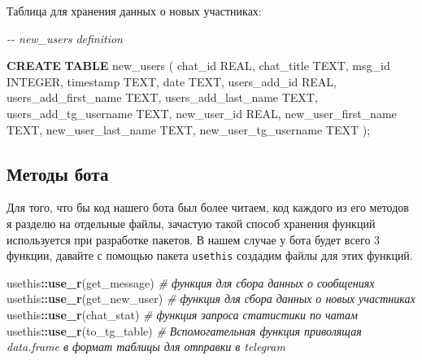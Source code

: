 \documentclass[
]{book}
\newenvironment{Shaded}{\begin{snugshade}}{\end{snugshade}}
\newcommand{\CommentTok}[1]{\textcolor[rgb]{0.56,0.35,0.01}{\textit{#1}}}
\newcommand{\DataTypeTok}[1]{\textcolor[rgb]{0.13,0.29,0.53}{#1}}
\newcommand{\FunctionTok}[1]{\textcolor[rgb]{0.13,0.29,0.53}{\textbf{#1}}}
\newcommand{\KeywordTok}[1]{\textcolor[rgb]{0.13,0.29,0.53}{\textbf{#1}}}
\newcommand{\NormalTok}[1]{#1}
\newcommand{\SpecialCharTok}[1]{\textcolor[rgb]{0.81,0.36,0.00}{\textbf{#1}}}
\newcommand{\StringTok}[1]{\textcolor[rgb]{0.31,0.60,0.02}{#1}}
\begin{document}
Таблица для хранения данных о новых участниках:

\begin{Shaded}
\begin{Highlighting}[]
\CommentTok{{-}{-} new\_users definition}

\KeywordTok{CREATE} \KeywordTok{TABLE}\NormalTok{ \textasciigrave{}new\_users\textasciigrave{} (}
\NormalTok{  \textasciigrave{}chat\_id\textasciigrave{} }\DataTypeTok{REAL}\NormalTok{,}
\NormalTok{  \textasciigrave{}chat\_title\textasciigrave{} TEXT,}
\NormalTok{  \textasciigrave{}msg\_id\textasciigrave{} }\DataTypeTok{INTEGER}\NormalTok{,}
\NormalTok{  \textasciigrave{}timestamp\textasciigrave{} TEXT,}
\NormalTok{  \textasciigrave{}date\textasciigrave{} TEXT,}
\NormalTok{  \textasciigrave{}users\_add\_id\textasciigrave{} }\DataTypeTok{REAL}\NormalTok{,}
\NormalTok{  \textasciigrave{}users\_add\_first\_name\textasciigrave{} TEXT,}
\NormalTok{  \textasciigrave{}users\_add\_last\_name\textasciigrave{} TEXT,}
\NormalTok{  \textasciigrave{}users\_add\_tg\_username\textasciigrave{} TEXT,}
\NormalTok{  \textasciigrave{}new\_user\_id\textasciigrave{} }\DataTypeTok{REAL}\NormalTok{,}
\NormalTok{  \textasciigrave{}new\_user\_first\_name\textasciigrave{} TEXT,}
\NormalTok{  \textasciigrave{}new\_user\_last\_name\textasciigrave{} TEXT,}
\NormalTok{  \textasciigrave{}new\_user\_tg\_username\textasciigrave{} TEXT}
\NormalTok{);}
\end{Highlighting}
\end{Shaded}

\subsection{Методы бота}\label{ux43cux435ux442ux43eux434ux44b-ux431ux43eux442ux430}

Для того, что бы код нашего бота был более читаем, код каждого из его методов я разделю на отдельные файлы, зачастую такой способ хранения функций используется при разработке пакетов. В нашем случае у бота будет всего 3 функции, давайте с помощью пакета \texttt{usethis} создадим файлы для этих функций.

\begin{Shaded}
\begin{Highlighting}[]
\NormalTok{usethis}\SpecialCharTok{::}\FunctionTok{use\_r}\NormalTok{(}\StringTok{\textquotesingle{}get\_message\textquotesingle{}}\NormalTok{)  }\CommentTok{\# функция для сбора данных о сообщениях}
\NormalTok{usethis}\SpecialCharTok{::}\FunctionTok{use\_r}\NormalTok{(}\StringTok{\textquotesingle{}get\_new\_user\textquotesingle{}}\NormalTok{) }\CommentTok{\# функция для сбора данных о новых участниках}
\NormalTok{usethis}\SpecialCharTok{::}\FunctionTok{use\_r}\NormalTok{(}\StringTok{\textquotesingle{}chat\_stat\textquotesingle{}}\NormalTok{)    }\CommentTok{\# функция запроса статистики по чатам}
\NormalTok{usethis}\SpecialCharTok{::}\FunctionTok{use\_r}\NormalTok{(}\StringTok{\textquotesingle{}to\_tg\_table\textquotesingle{}}\NormalTok{)  }\CommentTok{\# Вспомогательная функция приволящая data.frame в формат таблицы для отправки в telegram}
\end{Highlighting}
\end{Shaded}
\end{document}
